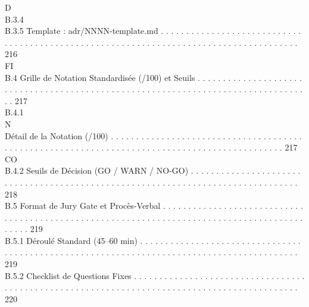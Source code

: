 \documentclass[12pt,landscape,a4paper]{article}
\begin{document}
\vspace{0.5em}
\vspace{0.5em}
\vspace{0.5em}
\vspace{0.5em}
D\\
B.3.4\\
B.3.5              Template : adr/NNNN-template.md . . . . . . . . . . . . . . . . . . . . . . . . . . . . . . . . . . . . . . . . . . . . . . . . . . . . . . . . . . . . . . . . . . . . . . . . . . . . . . . . . . . . . . 216\\
\vspace{0.5em}
\vspace{0.5em}
\vspace{0.5em}
\vspace{0.5em}
FI\\
B.4     Grille de Notation Standardisée (/100) et Seuils . . . . . . . . . . . . . . . . . . . . . . . . . . . . . . . . . . . . . . . . . . . . . . . . . . . . . . . . . . . . . . . . . . . . . . . . . . . . . . . . . . 217\\
B.4.1\\
N\\
Détail de la Notation (/100) . . . . . . . . . . . . . . . . . . . . . . . . . . . . . . . . . . . . . . . . . . . . . . . . . . . . . . . . . . . . . . . . . . . . . . . . . . . . . . . . . . . . . . . . . . . . . 217\\
CO\\
B.4.2              Seuils de Décision (GO / WARN / NO-GO) . . . . . . . . . . . . . . . . . . . . . . . . . . . . . . . . . . . . . . . . . . . . . . . . . . . . . . . . . . . . . . . . . . . . . . . . . . . . . . . . 218\\
B.5     Format de Jury Gate et Procès-Verbal . . . . . . . . . . . . . . . . . . . . . . . . . . . . . . . . . . . . . . . . . . . . . . . . . . . . . . . . . . . . . . . . . . . . . . . . . . . . . . . . . . . . . . . . . . . . 219\\
B.5.1              Déroulé Standard (45–60 min) . . . . . . . . . . . . . . . . . . . . . . . . . . . . . . . . . . . . . . . . . . . . . . . . . . . . . . . . . . . . . . . . . . . . . . . . . . . . . . . . . . . . . . . . . . 219\\
B.5.2              Checklist de Questions Fixes . . . . . . . . . . . . . . . . . . . . . . . . . . . . . . . . . . . . . . . . . . . . . . . . . . . . . . . . . . . . . . . . . . . . . . . . . . . . . . . . . . . . . . . . . . . . 220\\
\end{document}
